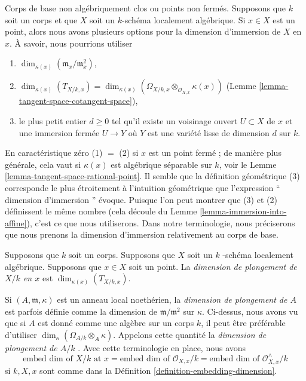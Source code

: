\medskip\noindent
Corps de base non algébriquement clos ou points non fermés. Supposons
que $k$ soit un corps et que $X$ soit un $k$-schéma localement
algébrique. Si $x \in X$ est un point, alors nous avons plusieurs options
pour la dimension d’immersion de $X$ en $x$. À savoir, nous pourrions utiliser
\begin{enumerate}
\item $\dim_{\kappa(x)}(\mathfrak m_x/\mathfrak m_x^2)$,
\item $\dim_{\kappa(x)}(T_{X/k, x}) =
\dim_{\kappa(x)}(\Omega_{X/k, x} \otimes_{\mathcal{O}_{X, x}}
\kappa(x))$ (Lemme \ref{lemma-tangent-space-cotangent-space}),
\item le plus petit entier $d \geq 0$ tel qu'il existe un
voisinage ouvert $U \subset X$ de $x$ et une immersion fermée
$U \to Y$ où $Y$ est une variété lisse de dimension $d$ sur $k$.
\end{enumerate}
En caractéristique zéro (1) $=$ (2) si $x$ est un
point fermé ; de manière plus générale, cela vaut si
$\kappa(x)$ est algébrique séparable sur $k$, voir le
Lemme \ref{lemma-tangent-space-rational-point}. Il
semble que la définition géométrique (3) corresponde
le plus étroitement à l'intuition géométrique que
l'expression `` dimension d'immersion '' évoque.
Puisque l'on peut montrer que (3) et (2) définissent
le même nombre (cela découle du Lemme
\ref{lemma-immersion-into-affine}), c'est ce que nous
utiliserons. Dans notre terminologie, nous préciserons que nous
prenons la dimension d'immersion relativement au corps de base.

\begin{definition}
\label{definition-embedding-dimension}
Supposons que $k$ soit un corps. Supposons que $X$ soit un $k$ -schéma
localement algébrique. Supposons que $x \in X$ soit un point. La {\it
dimension de plongement de $X/k$ en $x$ } est $\dim_{\kappa(x)}(T_{X/k, x})$.
\end{definition}

\noindent
Si $(A, \mathfrak m, \kappa)$ est un anneau local noethérien, la
{\it dimension de plongement de $A$ } est parfois définie comme la
dimension de $\mathfrak m/\mathfrak m^2$ sur $\kappa$. Ci-dessus,
nous avons vu que si $A$ est donné comme une algèbre sur un corps
$k$, il peut être préférable d'utiliser $\dim_\kappa(\Omega_{A/k}
\otimes_A \kappa)$. Appelons cette quantité la {\it dimension de
plongement de $A/k$ }. Avec cette terminologie en place, nous avons
$$
\text{embed dim of }X/k\text{ at }x =
\text{embed dim of }\mathcal{O}_{X, x}/k =
\text{embed dim of }\mathcal{O}_{X, x}^\wedge/k
$$
si $k, X, x$ sont comme dans la Définition \ref{definition-embedding-dimension}.






